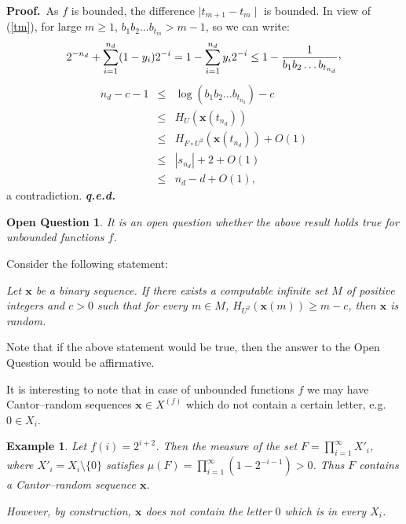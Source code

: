 \documentclass[11pt,a4paper,twoside]{article}
\newcommand{\x}{{\mathbf x}}
\def \XF  {X^{(f)}}
\def \raisecomma {\raisebox{.5ex}{,}}
\newtheorem{open}[theo]{Open Question}
\newtheorem{ex}[theo]{Example}
\newenvironment{proof}{\textbf{Proof.\,}}{\hfill\textbf{\itshape
q.e.d.}\par}
\begin{document}
\begin{proof}
As $f$ is bounded, the difference  $\mid t_{m+1}-  t_{m}\mid$ is bounded.  In view of (\ref{tm}), for large $m\ge 1$,
$b_{1}b_{2}\ldots b_{t_{m}} > m-1$, so we can write:
\begin{equation}
\label{errorcb}
2^{-n_{d}} + \sum_{i=1}^{n_{d}} (1-y_{i})2^{-i} = 1 - \sum_{i=1}^{n_{d}}
y_{i}2^{-i} \le  1 - \frac{1}{b_{1}b_{2}\ldots b_{t_{n_{d}}}}\raisecomma
\end{equation}
\fi
\begin{eqnarray*}
n_{d} - c -1  & \le & \log (b_{1}b_{2}\ldots b_{t_{n_{d}}}) - c\\
 & \le &  H_{U}(\x (t_{n_{d}}))\\
 & \le & H_{F \circ U^{2}} (\x (t_{n_{d}})) + O(1)\\
 & \le & |s_{n_{d}}| +  2 + O(1)\\
& \le & n_{d} -d +  O(1),
\end{eqnarray*}
a contradiction.
\end{proof}


\begin{open} It is an open question whether the above result holds true for unbounded
functions $f$.
\end{open}


Consider the following statement:
 
 \begin{center}
 \it
 Let $\x$ be a binary sequence. If there exists a computable infinite set
 $M$ of positive integers and $c>0$ such that for every $m\in M$, $H_{U^{2}}(\x(m))
 \ge m-c$, then $\x$ is random.
 \end{center}


 Note that if the above statement would be true,
then the answer to the Open Question would be affirmative.


It is interesting to note that in case of unbounded functions $f$ we
may have Cantor--random sequences $\x\in \XF$ which do not contain a
certain letter, e.g. $0\in X_i$.


\begin{ex}
Let $f(i)= 2^{i+2}$. Then the measure of the set $F=
\prod_{i=1}^\infty X'_i$, where $X'_i=X_i\setminus \{0\}$ satisfies
$\mu(F) = \prod_{i=1}^\infty (1- 2^{-i-1})>0$. Thus $F$ contains a
Cantor--random sequence $\x$.

However, by construction, $\x$ does not contain the letter $0$ which is in every $X_i$.
\end{ex}
\end{document}
